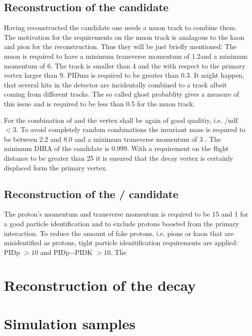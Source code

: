 \subsection{Reconstruction of the \Dz\mun candidate}
Having reconstructed the \Dz candidate one needs a muon track to combine them.
The motivation for the requirements on the muon track is analagous to the kaon and pion for the \Dz reconstruction.
Thus they will be just briefly mentioned:
The muon is required to have a minimum transverse momentum of 1.2\gev and a minimum momentum of 6\gev.
The track \chisqndf is smaller than 4 and the \chisqip with respect to the primary vertex larger than 9.
PIDmu is required to be greater than 0.3.
It might happen, that several hits in the detector are incidentally combined to a track albeit coming from different tracks.
The so called ghost probablity gives a measure of this issue and is required to be less than 0.5 for the muon track.

For the combination of \Dz and \mun the vertex shall be again of good qualitiy, i.e. \chisqvtx/ndf $<3$.
To avoid completely random combinations the invariant \Dz\mun mass is required to be between 2.2 and 8.0 \gev and a minimum transverse momentum of 3 \gev.
The minimum DIRA of the \Dz\mun candidate is 0.999.
With a requirement on the flight distance \chisq to be greater than 25 it is ensured that the \Dz\mun decay vertex is certainly displaced form the primary vertex.

\subsection{Reconstruction of the \Lb / \Dz\mun\proton candidate}
The proton's momentum and transverse momentum is required to be 15 \gev and 1 \gev for a good particle identification and to exclude protons boosted from the primary interaction.
To reduce the amount of fake protons, i.e. pions or kaon that are misidentified as protons, tight particle idenitification requirements are applied: PIDp $> 10$ and PIDp$-$PIDK $> 10$.
The \chisqip


\section{Reconstruction of the decay \LbToLcmunu}

\section{Simulation samples}


